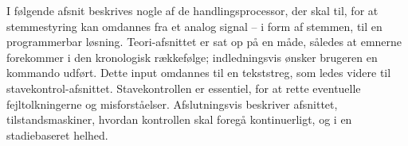 I følgende afsnit beskrives nogle af de handlingsprocessor, der skal til, for at stemmestyring kan omdannes fra et analog signal – i form af stemmen, til en programmerbar løsning. Teori-afsnittet er sat op på en måde, således at emnerne forekommer i den kronologisk rækkefølge; indledningsvis ønsker brugeren en kommando udført. Dette input omdannes til en tekststreg, som ledes videre til stavekontrol-afsnittet. Stavekontrollen er essentiel, for at rette eventuelle fejltolkningerne og misforståelser. Afslutningsvis beskriver afsnittet, tilstandsmaskiner, hvordan kontrollen skal foregå kontinuerligt, og i en stadiebaseret helhed.